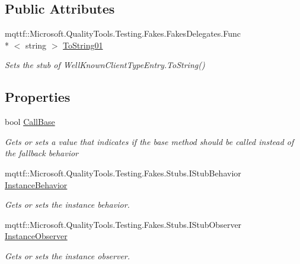\subsection*{Public Attributes}
\begin{DoxyCompactItemize}
\item 
mqttf\-::\-Microsoft.\-Quality\-Tools.\-Testing.\-Fakes.\-Fakes\-Delegates.\-Func\\*
$<$ string $>$ \hyperlink{class_system_1_1_runtime_1_1_remoting_1_1_fakes_1_1_stub_well_known_client_type_entry_a6ce3942895c5dc39ab9a1947bd1183b0}{To\-String01}
\begin{DoxyCompactList}\small\item\em Sets the stub of Well\-Known\-Client\-Type\-Entry.\-To\-String()\end{DoxyCompactList}\end{DoxyCompactItemize}
\subsection*{Properties}
\begin{DoxyCompactItemize}
\item 
bool \hyperlink{class_system_1_1_runtime_1_1_remoting_1_1_fakes_1_1_stub_well_known_client_type_entry_af745a7b66326b54733b6b9fd97b9f7ad}{Call\-Base}
\begin{DoxyCompactList}\small\item\em Gets or sets a value that indicates if the base method should be called instead of the fallback behavior\end{DoxyCompactList}\item 
mqttf\-::\-Microsoft.\-Quality\-Tools.\-Testing.\-Fakes.\-Stubs.\-I\-Stub\-Behavior \hyperlink{class_system_1_1_runtime_1_1_remoting_1_1_fakes_1_1_stub_well_known_client_type_entry_a89b2aec3cab886a47bfc4b8a71f0acf2}{Instance\-Behavior}
\begin{DoxyCompactList}\small\item\em Gets or sets the instance behavior.\end{DoxyCompactList}\item 
mqttf\-::\-Microsoft.\-Quality\-Tools.\-Testing.\-Fakes.\-Stubs.\-I\-Stub\-Observer \hyperlink{class_system_1_1_runtime_1_1_remoting_1_1_fakes_1_1_stub_well_known_client_type_entry_ad0a0341a5a98082014d2cd005b314617}{Instance\-Observer}
\begin{DoxyCompactList}\small\item\em Gets or sets the instance observer.\end{DoxyCompactList}\end{DoxyCompactItemize}


